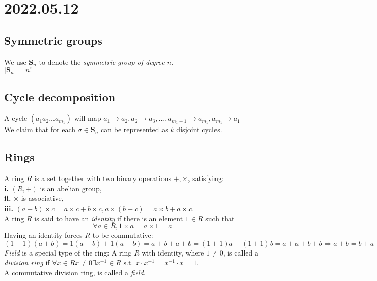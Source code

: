 \documentclass{article}
\begin{document}
\section{2022.05.12}
\subsection{Symmetric groups}
We use $\textbf{S}_n$ to denote the \textit{symmetric group of degree $n$}.\\
$|\textbf{S}_n| = n!$
\subsection{Cycle decomposition}
A cycle $(a_1 a_2 ... a_{m_1})$ will map $a_1 \rightarrow a_2, a_2 \rightarrow a_3, ..., a_{m_1 - 1} \rightarrow a_{m_1}, a_{m_1} \rightarrow a_1$\\
We claim that for each $\sigma \in \textbf{S}_n$ can be represented as $k$ disjoint cycles.
\subsection{Rings}
A ring $R$ is a set together with two binary operations $+,\times$, satisfying:\\
\textbf{i.} $(R,+)$ is an abelian group,\\
\textbf{ii.} $\times$ is associative,\\
\textbf{iii.} $(a+b)\times c = a\times c + b\times c, a\times(b+c) = a\times b + a\times c$.\\
A ring $R$ is said to have an \textit{identity} if there is an element $1 \in R$ such that
\begin{equation*}
    \forall a \in R, 1 \times a = a \times 1 = a
\end{equation*}
Having an identity forces $R$ to be commutative:
\begin{equation*}
    (1+1)(a+b) = 1(a+b) + 1(a+b) = a+b + a+b = (1+1)a + (1+1)b = a+a + b+b \Rightarrow a+b = b+a
\end{equation*}
\textit{Field} is a special type of the ring:
A ring $R$ with identity, where $1 \neq 0$, is called a \textit{division ring} if $\forall x \in R x \neq 0 \exists x^{-1} \in R \textrm{ s.t. } x \cdot x^{-1} = x^{-1} \cdot x = 1$.\\
A commutative division ring, is called a \textit{field}.\\
\end{document}
